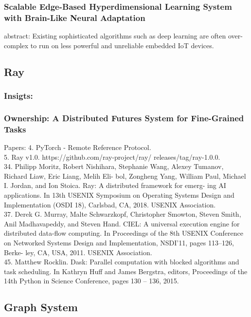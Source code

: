 \documentclass[8pt,UTF8]{article}
\begin{document}
        \subsubsection{Scalable Edge-Based Hyperdimensional Learning System with Brain-Like Neural Adaptation}
            abstract:
            Existing sophisticated algorithms such as deep learning are often over-complex to run on less powerful and unreliable embedded IoT devices. 
    
    \subsection{Ray}
        \subsubsection{Insigts:}
        \subsubsection{Ownership: A Distributed Futures System for Fine-Grained Tasks~\cite{wang2021ownership}}
            Papers:
            4. PyTorch - Remote Reference Protocol. \\
            5. Ray v1.0. https://github.com/ray-project/ray/ releases/tag/ray-1.0.0.\\
            34. Philipp Moritz, Robert Nishihara, Stephanie Wang, Alexey Tumanov, Richard Liaw, Eric Liang, Melih Eli- bol, Zongheng Yang, William Paul, Michael I. Jordan, and Ion Stoica. Ray: A distributed framework for emerg- ing AI applications. In 13th USENIX Symposium on Operating Systems Design and Implementation (OSDI 18), Carlsbad, CA, 2018. USENIX Association.\\
            37. Derek G. Murray, Malte Schwarzkopf, Christopher Smowton, Steven Smith, Anil Madhavapeddy, and Steven Hand. CIEL: A universal execution engine for distributed data-flow computing. In Proceedings of the 8th USENIX Conference on Networked Systems Design and Implementation, NSDI’11, pages 113–126, Berke- ley, CA, USA, 2011. USENIX Association.\\
            45. Matthew Rocklin. Dask: Parallel computation with blocked algorithms and task scheduling. In Kathryn Huff and James Bergstra, editors, Proceedings of the 14th Python in Science Conference, pages 130 – 136, 2015.\\
    
    \subsection{Graph System}
\end{document}
